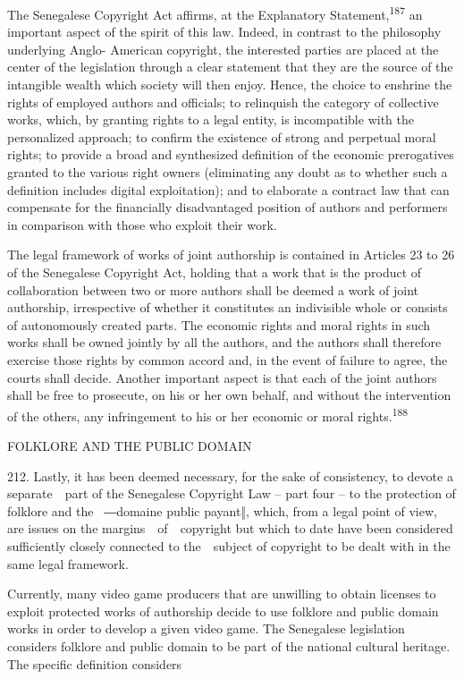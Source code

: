 \documentclass[
]{article}
\begin{document}
{The Senegalese }{Copyright Act }{affirms, at the Explanatory
Statement,}\textsuperscript{{187 }}{an important aspect of the spirit of
this law. Indeed, in contrast to the philosophy underlying Anglo-
American copyright, the interested parties are placed at the center of
the legislation through a clear statement that they are the source of
the intangible wealth which society will then enjoy. Hence, the choice
to enshrine the rights of employed authors and officials; to relinquish
the category of collective works, which, by granting rights to a legal
entity, is incompatible with the personalized approach; to confirm the
existence of strong and perpetual moral rights; to provide a broad and
synthesized definition of the economic prerogatives granted to the
various right owners (eliminating any doubt as to whether such a
definition includes digital exploitation); and to elaborate a contract
law that can compensate for the financially disadvantaged position of
authors and performers in comparison with those who exploit their work.}

{The legal framework of works of joint authorship is contained in
Articles 23 to 26 of the Senegalese }{Copyright Act}{, holding that }{a
work that is the product of collaboration between two or more authors
shall be deemed a work of joint authorship, irrespective of whether it
constitutes an indivisible whole or consists of autonomously created
parts}{. The economic rights and moral rights in such works shall be
owned jointly by all the authors, and the authors shall therefore
exercise those rights by common accord and, in the event of failure to
agree, the courts shall decide. Another important aspect is that each of
the joint authors shall be free to prosecute, on his or her own behalf,
and without the intervention of the others, any infringement to his or
her economic or moral rights.}\textsuperscript{{188}}

{FOLKLORE AND THE PUBLIC DOMAIN}

{212. }{Lastly, it has been deemed necessary, for the sake of
consistency, to devote a separate~~part of the Senegalese }{Copyright
Law }{-- }{part four }{-- }{to the protection of folklore and the
}{~―}{domaine public payant‖}{, which, from a legal point of view, are
issues on the margins~~of~~copyright but which to date have been
considered sufficiently closely connected to the~~subject of copyright
to be dealt with in the same legal framework.}

{Currently, many video game producers that are unwilling to obtain
licenses to exploit protected works of authorship decide to use folklore
and public domain works in order to develop a given video game. The
Senegalese legislation considers folklore and public domain to be part
of the national cultural heritage. The specific definition considers}
\end{document}
